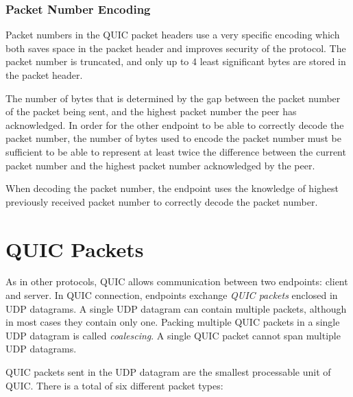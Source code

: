 \subsubsection{Packet Number Encoding}\label{sec:packet-number-encoding}


Packet numbers in the QUIC packet headers use a very specific encoding which both saves space in the
packet header and improves security of the protocol. The packet number is truncated, and only up to
4 least significant bytes are stored in the packet header.

The number of bytes that is determined by the gap between the packet number of the packet being
sent, and the highest packet number the peer has acknowledged. In order for the other endpoint to be
able to correctly decode the packet number, the number of bytes used to encode the packet number
must be sufficient to be able to represent at least twice the difference between the current packet
number and the highest packet number acknowledged by the peer.

When decoding the packet number, the endpoint uses the knowledge of highest previously received
packet number to correctly decode the packet number.



\section{QUIC Packets}

As in other protocols, QUIC allows communication between two endpoints: client and server. In QUIC
connection, endpoints exchange \textit{QUIC packets} enclosed in UDP datagrams. A single UDP
datagram can contain multiple packets, although in most cases they contain only one. Packing
multiple QUIC packets in a single UDP datagram is called \textit{coalescing}. A single QUIC packet
cannot span multiple UDP datagrams.

QUIC packets sent in the UDP datagram are the smallest processable unit of QUIC\@. There is a total
of six different packet types:

